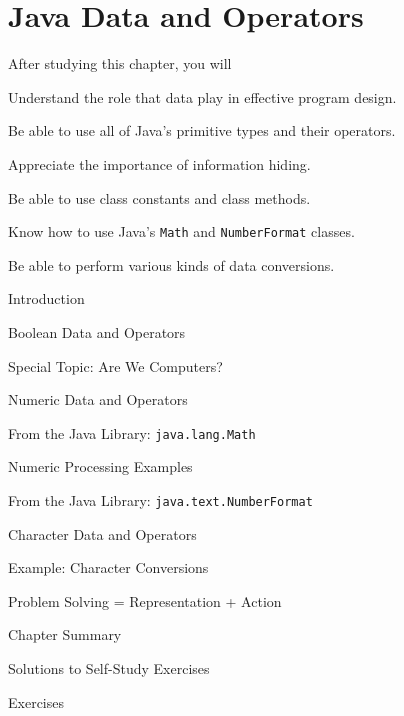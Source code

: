 
\setcounter{chapter}{4}
\setcounter{SSTUDYcount}{1}
\chapter{Java Data and Operators}
\label{chapter-models}


\CObegin
{}
\label{objectives}

\noindent After studying this chapter, you will
\begin{COBL}
\item  Understand the role that data play in effective program design.
\item  Be able to use all of Java's primitive types and their operators.
\item  Appreciate the importance of information hiding.
\item  Be able to use class constants and class methods.
\item  Know how to use Java's {\tt Math} and {\tt NumberFormat} classes.
\item  Be able to perform various kinds of data conversions.
\end{COBL}


\label{outline}
\begin{COL}
\item Introduction
\item Boolean Data and Operators
\item[] {{\color{cyan}Special Topic:} Are We Computers?}
\item Numeric Data and Operators
\item From the Java Library: {\tt java.lang.Math}
\item Numeric Processing Examples
\item From the Java Library: {\tt java.text.NumberFormat}
\item Character Data and Operators
\item Example: Character Conversions
\item Problem Solving  = Representation  + Action
\par\small\item[] Chapter Summary
\par\small\item[] Solutions to Self-Study Exercises
\par\small\item[] Exercises
\end{COL}
\COend

